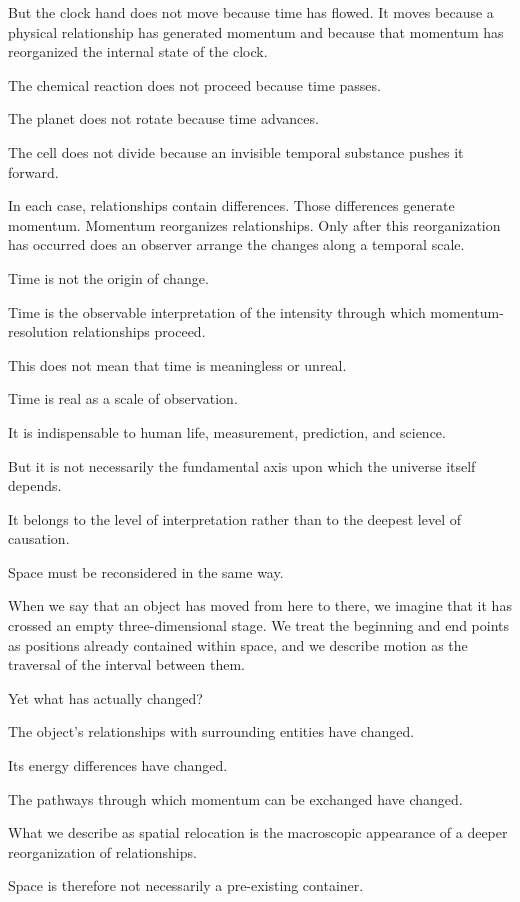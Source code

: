 But the clock hand does not move because time has flowed. It moves because a physical relationship has generated momentum and because that momentum has reorganized the internal state of the clock.

The chemical reaction does not proceed because time passes.

The planet does not rotate because time advances.

The cell does not divide because an invisible temporal substance pushes it forward.

In each case, relationships contain differences. Those differences generate momentum. Momentum reorganizes relationships. Only after this reorganization has occurred does an observer arrange the changes along a temporal scale.

Time is not the origin of change.

Time is the observable interpretation of the intensity through which momentum-resolution relationships proceed.

This does not mean that time is meaningless or unreal.

Time is real as a scale of observation.

It is indispensable to human life, measurement, prediction, and science.

But it is not necessarily the fundamental axis upon which the universe itself depends.

It belongs to the level of interpretation rather than to the deepest level of causation.

Space must be reconsidered in the same way.

When we say that an object has moved from here to there, we imagine that it has crossed an empty three-dimensional stage. We treat the beginning and end points as positions already contained within space, and we describe motion as the traversal of the interval between them.

Yet what has actually changed?

The object’s relationships with surrounding entities have changed.

Its energy differences have changed.

The pathways through which momentum can be exchanged have changed.

What we describe as spatial relocation is the macroscopic appearance of a deeper reorganization of relationships.

Space is therefore not necessarily a pre-existing container.


